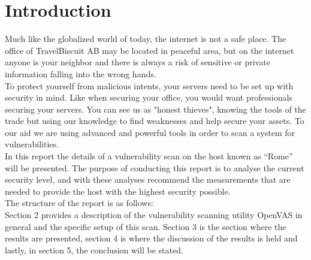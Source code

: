 \section{Introduction} \label{sec:intro}

Much like the globalized world of today, the internet is not a safe place.
The office of TravelBiscuit AB may be located in peaceful area, but on the internet anyone is your neighbor and there is always a risk of sensitive or private information falling into the wrong hands. \\

\noindent To protect yourself from malicious intents, your servers need to be set up with security in mind.
Like when securing your office, you would want professionals securing your servers.
You can see us as "honest thieves", knowing the tools of the trade but using our knowledge to find weaknesses and help secure your assets.
To our aid we are using advanced and powerful tools in order to scan a system for vulnerabilities. \\

\noindent In this report the details of a vulnerability scan on the host known as “Rome” will be presented.
The purpose of conducting this report is to analyse the current security level, and with these analyses recommend the measurements that are needed to provide the host with the highest security possible. \\

\noindent The structure of the report is as follows: \\
Section 2 provides a description of the vulnerability scanning utility OpenVAS in general and the specific setup of this scan. Section 3 is the section where the results are presented, section 4 is where the discussion of the results is held and lastly, in section 5, the conclusion will be stated.